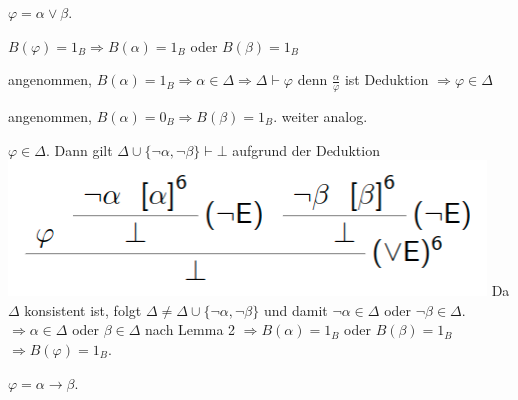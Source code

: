 \documentclass[a4paper]{article}
\begin{document}
\begin{multicols}{3}
  \begin{enumerate*}
    \setcounter{enumi}{2}
    \itemsep1pt\parskip0pt
    \item
          $\varphi =\alpha\vee\beta$.
  \end{enumerate*}

  \begin{itemize*}
    \itemsep1pt\parskip0pt
    \item
          $B(\varphi) = 1_B \Rightarrow B(\alpha) = 1_B$ oder $B(\beta) = 1_B$

          \begin{itemize*}
            \item
                  angenommen,
                  $B(\alpha) = 1_B \Rightarrow\alpha\in\Delta\Rightarrow\Delta\vdash\varphi$
                  denn $\frac{\alpha}{\varphi}$ ist Deduktion
                  $\Rightarrow\varphi\in\Delta$
            \item
                  angenommen, $B(\alpha) = 0_B \Rightarrow B(\beta) = 1_B$. weiter
                  analog.
          \end{itemize*}
    \item
          $\varphi\in\Delta$. Dann gilt
          $\Delta\cup\{\lnot\alpha ,\lnot\beta\}\vdash \bot$ aufgrund der
          Deduktion \includegraphics[width=\linewidth]{Assets/Logik-beispiel-8.png} Da $\Delta$
          konsistent ist, folgt
          $\Delta\not=\Delta\cup\{\lnot\alpha,\lnot\beta\}$ und damit
          $\lnot\alpha\in\Delta$ oder $\lnot\beta\in\Delta$.
          $\Rightarrow\alpha\in\Delta$ oder $\beta\in\Delta$ nach Lemma 2
          $\Rightarrow B(\alpha) = 1_B$ oder $B(\beta) =1_B$
          $\Rightarrow B(\varphi) = 1_B$.
  \end{itemize*}

  \begin{enumerate*}
    \setcounter{enumi}{3}
    \itemsep1pt\parskip0pt
    \item
          $\varphi = \alpha\rightarrow\beta$.
  \end{enumerate*}


\end{multicols}
\end{document}
